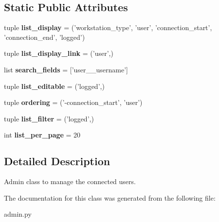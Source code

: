 \subsection*{Static Public Attributes}
\begin{DoxyCompactItemize}
\item 
\hypertarget{classrestriction__system_1_1admin_1_1WorkstationUserAdmin_ad9836e816823ba489c9b8425acb8bc77}{}tuple {\bfseries list\+\_\+display} = ('workstation\+\_\+type', 'user', 'connection\+\_\+start', 'connection\+\_\+end', 'logged')\label{classrestriction__system_1_1admin_1_1WorkstationUserAdmin_ad9836e816823ba489c9b8425acb8bc77}

\item 
\hypertarget{classrestriction__system_1_1admin_1_1WorkstationUserAdmin_ae74bba3b399e2f2f38c0a55c858e5336}{}tuple {\bfseries list\+\_\+display\+\_\+link} = ('user',)\label{classrestriction__system_1_1admin_1_1WorkstationUserAdmin_ae74bba3b399e2f2f38c0a55c858e5336}

\item 
\hypertarget{classrestriction__system_1_1admin_1_1WorkstationUserAdmin_af75eb2601e0307173f3bfe343b4d7454}{}list {\bfseries search\+\_\+fields} = \mbox{[}'user\+\_\+\+\_\+username'\mbox{]}\label{classrestriction__system_1_1admin_1_1WorkstationUserAdmin_af75eb2601e0307173f3bfe343b4d7454}

\item 
\hypertarget{classrestriction__system_1_1admin_1_1WorkstationUserAdmin_a3dc5f3d432154812675fd267c9ea0b7d}{}tuple {\bfseries list\+\_\+editable} = ('logged',)\label{classrestriction__system_1_1admin_1_1WorkstationUserAdmin_a3dc5f3d432154812675fd267c9ea0b7d}

\item 
\hypertarget{classrestriction__system_1_1admin_1_1WorkstationUserAdmin_ada30baf7771a61d7c6eda3ec16b74051}{}tuple {\bfseries ordering} = ('-\/connection\+\_\+start', 'user')\label{classrestriction__system_1_1admin_1_1WorkstationUserAdmin_ada30baf7771a61d7c6eda3ec16b74051}

\item 
\hypertarget{classrestriction__system_1_1admin_1_1WorkstationUserAdmin_ae55d4fefa48de18fa34a378156f63e35}{}tuple {\bfseries list\+\_\+filter} = ('logged',)\label{classrestriction__system_1_1admin_1_1WorkstationUserAdmin_ae55d4fefa48de18fa34a378156f63e35}

\item 
\hypertarget{classrestriction__system_1_1admin_1_1WorkstationUserAdmin_ad83373e4924cedc217c3c7236cf61618}{}int {\bfseries list\+\_\+per\+\_\+page} = 20\label{classrestriction__system_1_1admin_1_1WorkstationUserAdmin_ad83373e4924cedc217c3c7236cf61618}

\end{DoxyCompactItemize}


\subsection{Detailed Description}
Admin class to manage the connected users. 

The documentation for this class was generated from the following file\+:\begin{DoxyCompactItemize}
\item 
admin.\+py\end{DoxyCompactItemize}
